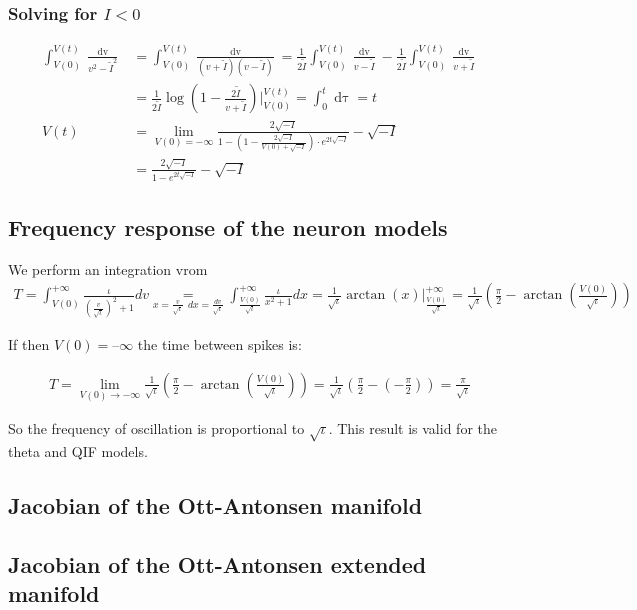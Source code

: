 \subsubsection{Solving for $I < 0$}
\begin{align*}
\int_{V(0)}^{V(t)} \frac{\mathop{dv}}{v^2 - \tilde{I}^2} &= \int_{V(0)}^{V(t)} \frac{\mathop{dv}}{(v+\tilde{I})(v-\tilde{I})} 
= \frac{1}{2 \tilde{I}} \int_{V(0)}^{V(t)} \frac{\mathop{dv}}{v-\tilde{I}}-\frac{1}{2 \tilde{I}} \int_{V(0)}^{V(t)} \frac{\mathop{dv}}{v+\tilde{I}} \\
&= \frac{1}{2 \tilde{I}} \log \left(1-\frac{2 \tilde{I}}{v+\tilde{I}}\right) \Big \rvert_{V(0)}^{V(t)} 
= \int_0^t \mathop{d\tau} = t \\
V(t) &= \lim_{V(0) = -\infty} \frac{2 \sqrt{-I}}{1 - \left(1-\frac{2 \sqrt{-I}}{V(0)+\sqrt{-I}}\right)\cdot e^{2 t \sqrt{-I}}}-\sqrt{-I}\\
&= \frac{2 \sqrt{-I}}{1 - e^{2 t \sqrt{-I}}}-\sqrt{-I}
\end{align*}


\subsection{Frequency response of the neuron models} \label{app:ThetaModelFrequencyResponse}
We perform an integration vrom
\begin{align*}
T = \int_{V(0)}^{+\infty} \frac{\iota}{\left(\frac{v}{\sqrt{\iota}}\right)^2 + 1} dv 
\underset{x = \frac{v}{\sqrt{\iota}} \: \:dx = \frac{dv}{\sqrt{\iota}}}{=} 
\int_{\frac{V(0)}{\sqrt{\iota}}}^{+\infty} \frac{\iota}{x^2 + 1} dx 
= \frac{1}{\sqrt{\iota}} \arctan(x) \rvert_{\frac{V(0)}{\sqrt{\iota}}}^{+\infty} 
= \frac{1}{\sqrt{\iota}} \left( \frac{\pi}{2} - \arctan \left( \frac{V(0)}{\sqrt{\iota}} \right) \right)
\end{align*}

If then $V(0) = –\infty$ the time between spikes is:

\begin{align*}
T = \lim_{V(0) \rightarrow -\infty} \frac{1}{\sqrt{\iota}} \left( \frac{\pi}{2} - \arctan \left( \frac{V(0)}{\sqrt{\iota}} \right) \right) = \frac{1}{\sqrt{\iota}} \left( \frac{\pi}{2} - \left( - \frac{\pi}{2} \right) \right)
= \frac{\pi}{\sqrt{\iota}}
\end{align*}

So the frequency of oscillation is proportional to $\sqrt{\iota}$. This result is valid for the theta and QIF models.


\subsection{Jacobian of the Ott-Antonsen manifold}
\subsection{Jacobian of the Ott-Antonsen extended manifold}








